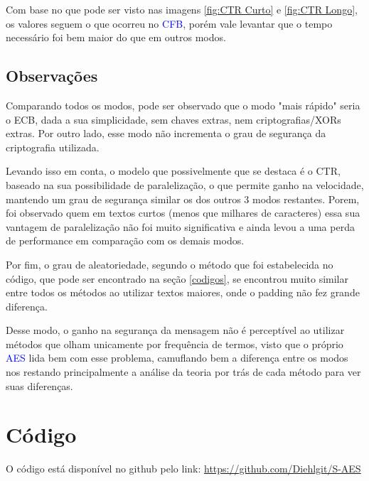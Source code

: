 \documentclass[12pt]{article}
\newcommand{\blue}[1]{\textcolor{blue}{#1}}
\begin{document}
Com base no que pode ser visto nas imagens \ref{fig:CTR Curto} e \ref{fig:CTR Longo}, os valores seguem o que ocorreu no \blue{CFB}, porém vale levantar que o tempo necessário foi bem maior do que em outros modos.

\subsection{Observações}
Comparando todos os modos, pode ser observado que o modo "mais rápido" seria o ECB, dada a sua simplicidade, sem chaves extras, nem criptografias/XORs extras. Por outro lado, esse modo não incrementa o grau de segurança da criptografia utilizada. 

Levando isso em conta, o modelo que possivelmente que se destaca é o CTR, baseado na sua possibilidade de paralelização, o que permite ganho na velocidade, mantendo um grau de segurança similar os dos outros 3 modos restantes. Porem, foi observado quem em textos curtos (menos que milhares de caracteres) essa sua vantagem de paralelização não foi muito significativa e ainda levou a uma perda de performance em comparação com os demais modos.

Por fim, o grau de aleatoriedade, segundo o método que foi estabelecida no código, que pode ser encontrado na seção \ref{codigos}, se encontrou muito similar entre todos os métodos ao utilizar textos maiores, onde o padding não fez grande diferença. 

Desse modo, o ganho na segurança da mensagem não é perceptível ao utilizar métodos que olham unicamente por frequência de termos, visto que o próprio \blue{AES} lida bem com esse problema, camuflando bem a diferença entre os modos nos restando principalmente a análise da teoria por trás de cada método para ver suas diferenças. 

\section{Código}
O código está disponível no github pelo link: \href{https://github.com/Diehlgit/S-AES}{https://github.com/Diehlgit/S-AES}
\end{document}
